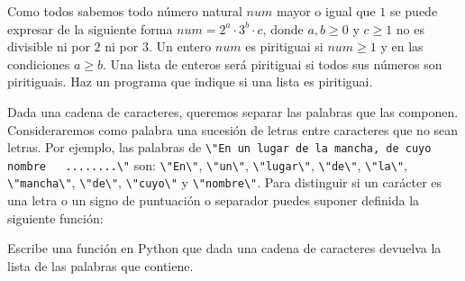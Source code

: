 \documentclass[10pt]{examdesign}
\begin{document}
\begin{shortanswer}
[title={Preguntas para desarrollar (4 puntos)},  suppressprefix]
  \begin{question}[2 pt]
  Como todos sabemos todo número natural $num$ mayor o igual que $1$ se puede
expresar de la siguiente forma $num = 2^a\cdot 3^b\cdot c$, donde
$a,b\geq 0$ y $c\geq 1$ no es divisible ni por $2$ ni por $3$.
Un entero $num$ es piritiguai si $num\geq 1$ y en las condiciones $a\geq b$. Una lista
de enteros será piritiguai si todos sus números son piritiguais.
Haz un programa que indique si una lista es piritiguai.
  \end{question}

  \begin{question}[2 pt]
  Dada una cadena de caracteres, queremos separar las palabras que las componen.
Consideraremos como palabra una sucesión de letras entre caracteres que no sean letras. Por ejemplo,
las palabras de \lstinline{\"En un lugar de la mancha, de cuyo nombre
  ........\"}
son: \lstinline{\"En\"}, \lstinline{\"un\"}, \lstinline{\"lugar\"},
\lstinline{\"de\"},
\lstinline{\"la\"}, \lstinline{\"mancha\"}, \lstinline{\"de\"}, \lstinline{\"cuyo\"} y \lstinline{\"nombre\"}.
Para distinguir si un carácter es una letra o un signo de puntuación o separador puedes suponer definida la siguiente función:

Escribe una función en Python que dada una cadena de caracteres devuelva la lista de las palabras que contiene.


  \end{question}




\end{shortanswer}
\end{document}
